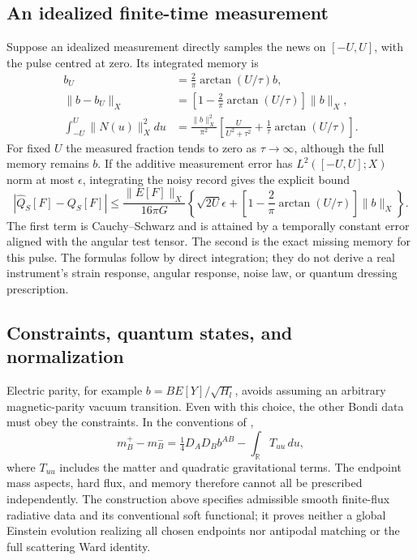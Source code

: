 \subsection{An idealized finite-time measurement}
Suppose an idealized measurement directly samples the news on
$[-U,U]$, with the pulse centred at zero. Its integrated memory is
\begin{align}
 b_U&=\frac2\pi\arctan(U/\tau)b,\label{eq:windowmemory}\\
 \|b-b_U\|_X&=\left[1-\frac2\pi\arctan(U/\tau)\right]\|b\|_X,\\
 \int_{-U}^U\|N(u)\|_X^2du
 &=\frac{\|b\|_X^2}{\pi^2}
 \left[\frac{U}{U^2+\tau^2}+\frac1\tau\arctan(U/\tau)\right].
 \label{eq:windowflux}
\end{align}
For fixed $U$ the measured fraction tends to zero as $\tau\to\infty$,
although the full memory remains $b$. If the additive measurement
error has $L^2([-U,U];X)$ norm at most $\epsilon$, integrating the noisy
record gives the explicit bound
\begin{equation}\label{eq:windowchargeerror}
 |\widehat Q_S[F]-Q_S[F]|
 \le \frac{\|E[F]\|_X}{16\pi G}
 \left\{\sqrt{2U}\epsilon+
 \left[1-\frac2\pi\arctan(U/\tau)\right]\|b\|_X\right\}.
\end{equation}
The first term is Cauchy--Schwarz and is attained by a temporally
constant error aligned with the angular test tensor. The second is
the exact missing memory for this pulse. The formulas follow by direct
integration; they do not derive a real instrument's strain response,
angular response, noise law, or quantum dressing prescription.

\subsection{Constraints, quantum states, and normalization}
Electric parity, for example $b=B E[Y]/\sqrt{H_l}$, avoids assuming
an arbitrary magnetic-parity vacuum transition. Even with this choice,
the other Bondi data must obey the constraints. In the conventions of
\cite{pasterski},
\[
 m_B^+-m_B^- =\tfrac14 D_A D_B b^{AB}-\int_{\mathbb R}T_{uu}\,du,
\]
where $T_{uu}$ includes the matter and quadratic gravitational terms.
The endpoint mass aspects, hard flux, and memory therefore cannot
all be prescribed independently. The construction above specifies
admissible smooth finite-flux radiative data and its conventional soft
functional; it proves neither a global Einstein evolution realizing
all chosen endpoints nor antipodal matching or the full scattering
Ward identity.

